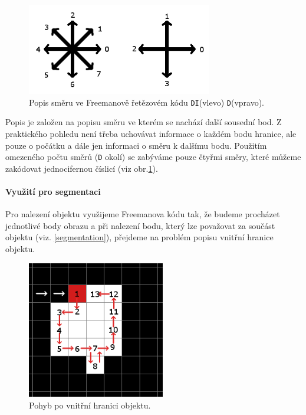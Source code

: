 \documentclass[12pt]{article}
\begin{document}
\begin{figure}
\centering
\vspace{-0.5cm}
\includegraphics[height=4cm]{Freeman_dir.png}
\caption{Popis směru ve Freemanově řetězovém kódu \texttt{DI}(vlevo) \texttt{D}(vpravo).}
\label{freeman_dir}
\end{figure}

Popis je založen na popisu směru ve kterém se nachází další sousední bod. Z praktického pohledu není třeba uchovávat informace o každém bodu hranice, ale pouze o počátku a dále jen informaci o směru k dalšímu bodu. Použitím omezeného počtu směrů (\texttt{D} okolí) se zabýváme pouze čtyřmi směry, které můžeme zakódovat jednocifernou číslicí (viz obr.\ref{freeman_dir}).

\paragraph{Využití pro segmentaci}
Pro nalezení objektu využijeme Freemanova kódu tak, že budeme procházet jednotlivé body obrazu a při nalezení bodu, který lze považovat za součást objektu (viz. \ref{segmentation}), přejdeme na problém popisu vnitřní hranice objektu.

\begin{figure}
\centering
\vspace{-0.0cm}
\includegraphics[height=6cm]{Freeman_edge.png}
\caption{Pohyb po vnitřní hranici objektu.}
\label{freeman_edge}
\end{figure}
\end{document}
